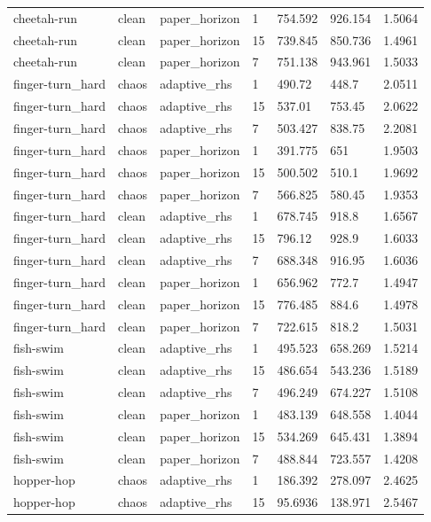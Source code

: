 \begin{tabular}{lllllll}
cheetah-run & clean & paper\_horizon & 1 & 754.592 & 926.154 & 1.5064 \\
cheetah-run & clean & paper\_horizon & 15 & 739.845 & 850.736 & 1.4961 \\
cheetah-run & clean & paper\_horizon & 7 & 751.138 & 943.961 & 1.5033 \\
finger-turn\_hard & chaos & adaptive\_rhs & 1 & 490.72 & 448.7 & 2.0511 \\
finger-turn\_hard & chaos & adaptive\_rhs & 15 & 537.01 & 753.45 & 2.0622 \\
finger-turn\_hard & chaos & adaptive\_rhs & 7 & 503.427 & 838.75 & 2.2081 \\
finger-turn\_hard & chaos & paper\_horizon & 1 & 391.775 & 651 & 1.9503 \\
finger-turn\_hard & chaos & paper\_horizon & 15 & 500.502 & 510.1 & 1.9692 \\
finger-turn\_hard & chaos & paper\_horizon & 7 & 566.825 & 580.45 & 1.9353 \\
finger-turn\_hard & clean & adaptive\_rhs & 1 & 678.745 & 918.8 & 1.6567 \\
finger-turn\_hard & clean & adaptive\_rhs & 15 & 796.12 & 928.9 & 1.6033 \\
finger-turn\_hard & clean & adaptive\_rhs & 7 & 688.348 & 916.95 & 1.6036 \\
finger-turn\_hard & clean & paper\_horizon & 1 & 656.962 & 772.7 & 1.4947 \\
finger-turn\_hard & clean & paper\_horizon & 15 & 776.485 & 884.6 & 1.4978 \\
finger-turn\_hard & clean & paper\_horizon & 7 & 722.615 & 818.2 & 1.5031 \\
fish-swim & clean & adaptive\_rhs & 1 & 495.523 & 658.269 & 1.5214 \\
fish-swim & clean & adaptive\_rhs & 15 & 486.654 & 543.236 & 1.5189 \\
fish-swim & clean & adaptive\_rhs & 7 & 496.249 & 674.227 & 1.5108 \\
fish-swim & clean & paper\_horizon & 1 & 483.139 & 648.558 & 1.4044 \\
fish-swim & clean & paper\_horizon & 15 & 534.269 & 645.431 & 1.3894 \\
fish-swim & clean & paper\_horizon & 7 & 488.844 & 723.557 & 1.4208 \\
hopper-hop & chaos & adaptive\_rhs & 1 & 186.392 & 278.097 & 2.4625 \\
hopper-hop & chaos & adaptive\_rhs & 15 & 95.6936 & 138.971 & 2.5467 \\

\end{tabular}

